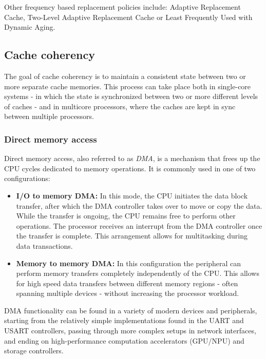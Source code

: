 \vspace{10px}\noindent Other frequency based replacement policies include: Adaptive Replacement Cache, Two-Level Adaptive Replacement Cache or Least Frequently Used with Dynamic Aging. %
%
\subsection{Cache coherency}

The goal of cache coherency is to maintain a consistent state between two or
more separate cache memories. This process can take place both in single-core
systems - in which the state is synchronized between two or more different levels of caches
- and in multicore processors, where the caches are kept in sync between multiple
processors.

\subsubsection{Direct memory access} \label{sec:dma}
Direct memory access, also referred to as \textit{DMA}, is a mechanism that
frees up the CPU cycles dedicated to memory operations. It is commonly used 
in one of two configurations:

\begin{itemize}
	\item \textbf{I/O to memory DMA:} In this mode, the CPU initiates the data block %
		transfer, after which the DMA controller takes over to move or copy the data.
		While the transfer is ongoing, the CPU remains free to perform other operations.
		The processor receives an interrupt from the DMA controller once the transfer is complete.
		This arrangement allows for multitasking during data transactions.
	\item \textbf{Memory to memory DMA:} In this configuration the peripheral can perform memory %
		transfers completely independently of the CPU. This allows for high speed data transfers
		between different memory regions - often spanning multiple devices - without increasing
		the processor workload.
\end{itemize}

\noindent DMA functionality can be found in a variety of modern devices and
peripherals, starting from the relatively simple implementations found in the
UART and USART controllers, passing through more complex setups in network %
interfaces, and ending on high-performance computation accelerators (GPU/NPU)
and storage controllers.

